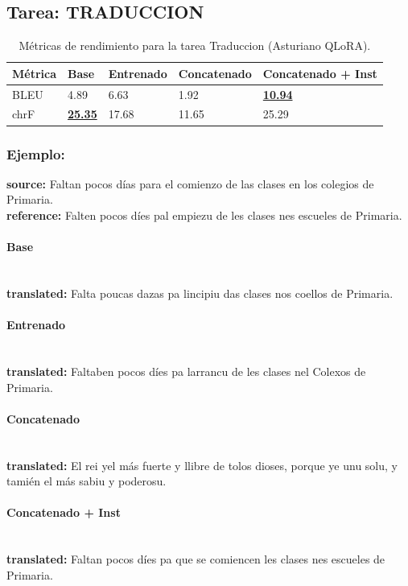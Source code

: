 \subsection{Tarea: TRADUCCION}\label{tarea-traduccion}
\begin{longtable}[]{@{}lllll@{}}
\toprule\noalign{}
Métrica & Base & Entrenado & Concatenado & Concatenado + Inst \\
\midrule\noalign{}
\endhead
\bottomrule\noalign{}
\caption{Métricas de rendimiento para la tarea Traduccion (Asturiano QLoRA).}
\label{tab:metricas_traduccion_Asturiano QLoRA}
\endlastfoot
BLEU & 4.89 & 6.63 & 1.92 & \textbf{\underline{10.94}} \\
chrF & \textbf{\underline{25.35}} & 17.68 & 11.65 & 25.29 \\
\end{longtable}

\subsubsection{Ejemplo:}
\textbf{source:} Faltan pocos días para el comienzo de las clases en los colegios de Primaria.\\
\textbf{reference:} Falten pocos díes pal empiezu de les clases nes escueles de Primaria.

\paragraph{Base}~\\
\textbf{translated:} Falta poucas dazas pa l\textquotesingle{}incipiu das clases nos coellos de Primaria.

\paragraph{Entrenado}~\\
\textbf{translated:} Faltaben pocos díes pa l\textquotesingle{}arrancu de les clases nel Colexos de Primaria.

\paragraph{Concatenado}~\\
\textbf{translated:} El rei ye\textquotesingle{}l más fuerte y llibre de tolos dioses, porque ye unu solu, y tamién el más sabiu y poderosu.

\paragraph{Concatenado + Inst}~\\
\textbf{translated:} Faltan pocos díes pa que se comiencen les clases nes escueles de Primaria.


